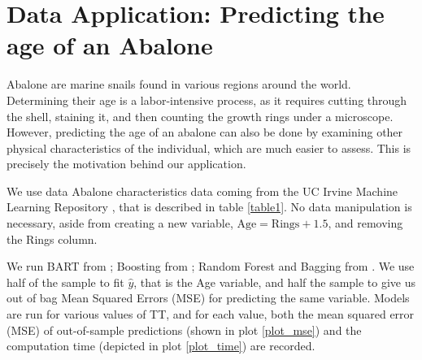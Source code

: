\documentclass[a4paper,11pt]{article}
\begin{document}
\section{Data Application: Predicting the age of an Abalone}

Abalone are marine snails found in various regions around the world. Determining their age is a labor-intensive process, as it requires cutting through the shell, staining it, and then counting the growth rings under a microscope. However, predicting the age of an abalone can also be done by examining other physical characteristics of the individual, which are much easier to assess. This is precisely the motivation behind our application.

We use data Abalone characteristics data coming from the UC Irvine Machine Learning Repository \parencite{warwicknashAbalone1994a}, that is described in table \ref{table1}. No data manipulation is necessary, aside from creating a new variable, \( \text{Age} = \text{Rings} + 1.5 \), and removing the Rings column.

 We run BART from \cite{mccullochBARTBayesianAdditive2024}; Boosting from \cite{ridgewayGbmGeneralizedBoosted2024}; Random Forest and Bagging from \cite{breimanRandomForestBreimanCutlers2024}. We use half of the sample to fit $\hat{y}$, that is the Age variable, and half the sample to give us out of bag Mean Squared Errors (MSE) for predicting the same variable. Models are run for various values of TT, and for each value, both the mean squared error (MSE) of out-of-sample predictions (shown in plot \ref{plot_mse}) and the computation time (depicted in plot \ref{plot_time}) are recorded.
\end{document}
